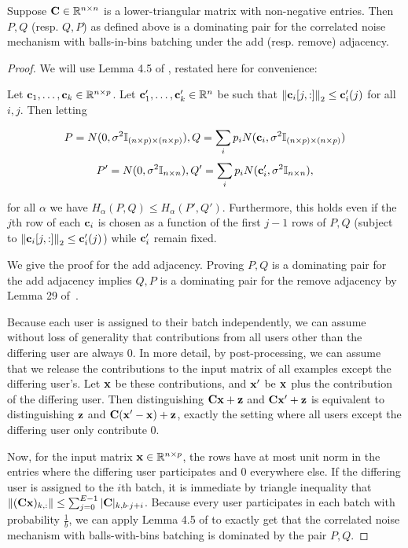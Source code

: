 \begin{lem}
\label{lem:bib-dim-red}
Suppose $\mathbf{C} \in \mathbb{R}^{n \times n}$ is a lower-triangular matrix with non-negative entries.
Then $P, Q$ (resp. $Q, P$) as defined above is a dominating pair for the correlated noise mechanism with balls-in-bins batching under the add (resp. remove) adjacency. 
\end{lem}


\begin{proof}
We will use Lemma 4.5 of \cite{choquettechoo2024privacy}, restated here for convenience:

\begin{lem}
Let $\mathbf{c}_1, \ldots, \mathbf{c}_k \in \mathbb{R}^{n \times p}$. Let $\mathbf{c}_1', \ldots, \mathbf{c}_k' \in \mathbb{R}^n$ be such that $\left\|\mathbf{c}_i[j, :]\right\|_2 \leq \mathbf{c}_i'(j)$ for all $i, j$. Then letting

\[P = N(0, \sigma^2 \mathbb{I}_{(n \times p) \times (n \times p)}), Q = \sum_i p_i N(\mathbf{c}_i, \sigma^2 \mathbb{I}_{(n \times p) \times (n \times p)}) \]    
\[P' = N(0, \sigma^2 \mathbb{I}_{n \times n}), Q' = \sum_i p_i N(\mathbf{c}_i', \sigma^2 \mathbb{I}_{n \times n}),\]

for all $\alpha$ we have $H_\alpha(P, Q) \leq H_\alpha(P', Q')$. Furthermore, this holds even if the $j$th row of each $\mathbf{c}_i$ is chosen as a function of the first $j-1$ rows of $P, Q$ (subject to $\left\|\mathbf{c}_i[j, :]\right\|_2 \leq \mathbf{c}_i'(j)$) while $\mathbf{c}_i'$ remain fixed.
\end{lem}

We give the proof for the add adjacency. Proving $P, Q$ is a dominating pair for the add adjacency implies $Q, P$ is a dominating pair for the remove adjacency by Lemma 29 of~\cite{zhu22optimal}.

Because each user is assigned to their batch independently, we can assume without loss of generality that contributions from all users other than the differing user are always $0$. In more detail, by post-processing, we can assume that we release the contributions to the input matrix of all examples except the differing user's. Let $\mathbf{x}$ be these contributions, and $\mathbf{x}'$ be $\mathbf{x}$ plus the contribution of the differing user. Then distinguishing $\mathbf{C} \mathbf{x} + \mathbf{z}$ and $\mathbf{C} \mathbf{x}' + \mathbf{z}$ is equivalent to distinguishing $\mathbf{z}$ and $\mathbf{C} (\mathbf{x}' - \mathbf{x}) + \mathbf{z}$, exactly the setting where all users except the differing user only contribute $0$.

Now, for the input matrix $\mathbf{x} \in \mathbb{R}^{n \times p}$, the rows have at most unit norm in the entries where the differing user participates and 0 everywhere else.
If the differing user is assigned to the $i$th batch, it is immediate by triangle inequality that
$
  {\left\Vert {(\ensuremath{\mathbf{C}}\ensuremath{\mathbf{x}})_{k, :}} \right\Vert}
  \leq \sum_{j=0}^{E-1}|\mathbf{C}|_{k, b\cdot j + i}
$. 
Because every user participates in each batch with probability $\frac{1}{b}$,
we can apply Lemma 4.5 of \citet{choquettechoo2024privacy} to exactly get that
the correlated noise mechanism with balls-with-bins batching is dominated by the pair $P, Q$.
\end{proof}

